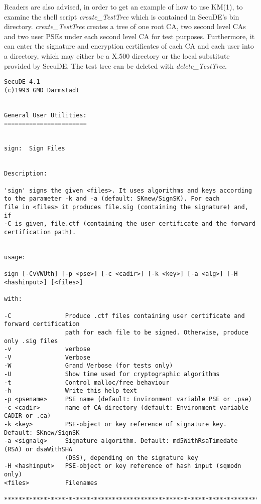 Readers are also advised, in order to get an example of how to use KM(1), to examine the shell 
script {\em create\_TestTree} which is contained in SecuDE's bin directory. 
{\em create\_TestTree} creates a tree of one root CA, two second level CAs and two
user PSEs under each second level CA for test purposes. Furthermore, it can enter
the signature and encryption certificates of each CA and each user into a directory, which 
may either be a X.500 directory or the local substitute provided by SecuDE. The test 
tree can be deleted with {\em delete\_TestTree}.

{\small
\begin{verbatim}
SecuDE-4.1                                                         (c)1993 GMD Darmstadt


General User Utilities:
=======================


sign:  Sign Files


Description:

'sign' signs the given <files>. It uses algorithms and keys according
to the parameter -k and -a (default: SKnew/SignSK). For each
file in <files> it produces file.sig (containing the signature) and, if
-C is given, file.ctf (containing the user certificate and the forward
certification path).


usage:

sign [-CvVWUth] [-p <pse>] [-c <cadir>] [-k <key>] [-a <alg>] [-H <hashinput>] [<files>]

with:

-C               Produce .ctf files containing user certificate and forward certification
                 path for each file to be signed. Otherwise, produce only .sig files
-v               verbose
-V               Verbose
-W               Grand Verbose (for tests only)
-U               Show time used for cryptographic algorithms
-t               Control malloc/free behaviour
-h               Write this help text
-p <psename>     PSE name (default: Environment variable PSE or .pse)
-c <cadir>       name of CA-directory (default: Environment variable CADIR or .ca)
-k <key>         PSE-object or key reference of signature key. Default: SKnew/SignSK
-a <signalg>     Signature algorithm. Default: md5WithRsaTimedate (RSA) or dsaWithSHA
                 (DSS), depending on the signature key
-H <hashinput>   PSE-object or key reference of hash input (sqmodn only)
<files>          Filenames

****************************************************************************************



\end{verbatim}}
